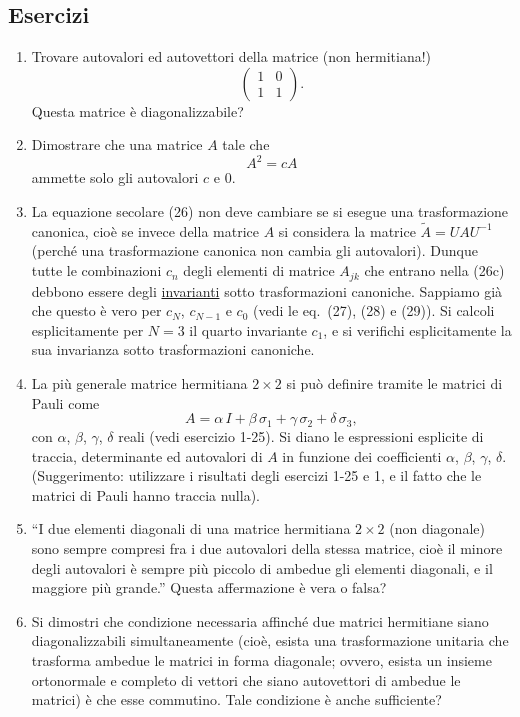 \documentclass[11pt, a4paper]{book}
\numberwithin{equation}{section}
\newenvironment{esercizi}{\subsection*{Esercizi}\begin{enumerate}}{\end{enumerate}}
\begin{document}
\begin{esercizi}
\item Trovare autovalori ed autovettori della matrice (non hermitiana!)
\[
\begin{pmatrix} 1 & 0 \\ 1 & 1 \end{pmatrix}.
\]
Questa matrice è diagonalizzabile?

\item Dimostrare che una matrice $A$ tale che
\[
A^2 = cA
\]
ammette solo gli autovalori $c$ e $0$.

\item La equazione secolare (26) non deve cambiare se si esegue una
trasformazione canonica, cioè se invece della matrice $A$ si considera la
matrice $\widetilde{A} = UAU^{-1}$ (perché una trasformazione canonica non
cambia gli autovalori). Dunque tutte le combinazioni $c_n$ degli elementi
di matrice $A_{jk}$ che entrano nella (26c) debbono essere degli
\underline{invarianti} sotto trasformazioni canoniche. Sappiamo già che
questo è vero per $c_N$, $c_{N-1}$ e $c_0$ (vedi le eq.\ (27), (28) e
(29)). Si calcoli esplicitamente per $N=3$ il quarto invariante $c_1$, e
si verifichi esplicitamente la sua invarianza sotto trasformazioni
canoniche.

\item La più generale matrice hermitiana $2\times2$ si può definire tramite
le matrici di Pauli come
\[
A = \alpha\, I + \beta\,\sigma_1 + \gamma\,\sigma_2 + \delta\,\sigma_3,
\]
con $\alpha$, $\beta$, $\gamma$, $\delta$ reali (vedi esercizio 1-25). Si
diano le espressioni esplicite di traccia, determinante ed autovalori di
$A$ in funzione dei coefficienti $\alpha$, $\beta$, $\gamma$, $\delta$.
(Suggerimento: utilizzare i risultati degli esercizi 1-25 e 1, e il fatto
che le matrici di Pauli hanno traccia nulla).

\item ``I due elementi diagonali di una matrice hermitiana $2\times2$ (non
diagonale) sono sempre compresi fra i due autovalori della stessa matrice,
cioè il minore degli autovalori è sempre più piccolo di ambedue gli
elementi diagonali, e il maggiore più grande.'' Questa affermazione è vera
o falsa?

\item Si dimostri che condizione necessaria affinché due matrici hermitiane
siano diagonalizzabili simultaneamente (cioè, esista una trasformazione
unitaria che trasforma ambedue le matrici in forma diagonale; ovvero,
esista un insieme ortonormale e completo di vettori che siano autovettori
di ambedue le matrici) è che esse commutino. Tale condizione è anche
sufficiente?


\end{esercizi}
\end{document}
